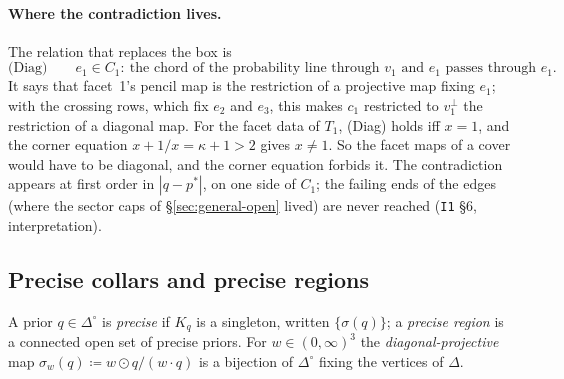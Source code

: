 \documentclass[11pt]{article}
\theoremstyle{definition}
\theoremstyle{remark}
\newcommand{\Di}{\Delta^{\circ}}
\newcommand{\src}[1]{\texttt{#1}}
\begin{document}
\paragraph{Where the contradiction lives.} The relation that replaces the box is
\[
\text{(Diag)}\qquad e_1\in C_1:\ \text{the chord of the probability line through $v_1$ and $e_1$ passes through $e_1$.}
\]
It says that facet~1's pencil map is the restriction of a projective map fixing $e_1$; with the crossing rows, which fix $e_2$ and $e_3$, this makes $c_1$ restricted to $v_1^\perp$ the restriction of a diagonal map. For the facet data of $T_1$, (Diag) holds iff $x=1$, and the corner equation $x+1/x=\kappa+1>2$ gives $x\ne1$. So the facet maps of a cover would have to be diagonal, and the corner equation forbids it. The contradiction appears at first order in $|q-p^*|$, on one side of $C_1$; the failing ends of the edges (where the sector caps of \S\ref{sec:general-open} lived) are never reached (\src{I1} \S6, interpretation).

\subsection{Precise collars and precise regions}\label{sec:gm-precise}

A prior $q\in\Di$ is \emph{precise} if $K_q$ is a singleton, written $\{\sigma(q)\}$; a \emph{precise region} is a connected open set of precise priors. For $w\in(0,\infty)^3$ the \emph{diagonal-projective} map $\sigma_w(q)\coloneqq w\odot q/(w\cdot q)$ is a bijection of $\Di$ fixing the vertices of $\Delta$.
\end{document}
